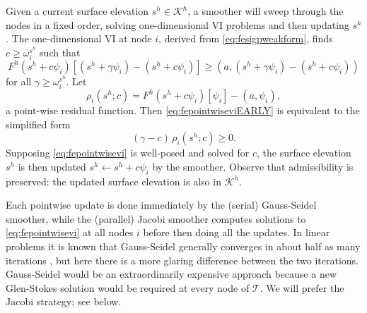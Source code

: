 \documentclass[letterpaper,final,12pt,reqno]{amsart}
\theoremstyle{claim}
\newcommand{\ip}[2]{\left(#1,#2\right)}
\numberwithin{equation}{section}
\numberwithin{figure}{section}
\numberwithin{table}{section}
\numberwithin{theorem}{section}
\begin{document}
Given a current surface elevation $s^h\in \mathcal{K}^h$, a smoother will sweep through the nodes in a fixed order, solving one-dimensional VI problems and then updating $s^h$.  The one-dimensional VI at node $i$, derived from \eqref{eq:fesigpweakform}, finds $c \ge \omega_i^{s^h}$ such that
\begin{equation}
F^h(s^h+c\psi_i)[(s^h+\gamma \psi_i) - (s^h+c \psi_i)] \ge \ip{a}{(s^h+\gamma \psi_i) - (s^h+c \psi_i)} \label{eq:fepointwiseviEARLY}
\end{equation}
for all $\gamma \ge \omega_i^{s^h}$.  Let
\begin{equation}
\rho_i(s^h; c) = F^h(s^h+c\psi_i)[\psi_i] - \ip{a}{\psi_i}, \label{eq:ferhoi}
\end{equation}
a point-wise residual function.  Then \eqref{eq:fepointwiseviEARLY} is equivalent to the simplified form
\begin{equation}
(\gamma - c) \,\rho_i(s^h; c) \ge 0. \label{eq:fepointwisevi}
\end{equation}
Supposing \eqref{eq:fepointwisevi} is well-posed and solved for $c$, the surface elevation $s^h$ is then updated $s^h \gets s^h + c \psi_i$ by the smoother.  Observe that admissibility is preserved: the updated surface elevation is also in $\mathcal{K}^h$.

Each pointwise update is done immediately by the (serial) Gauss-Seidel smoother, while the (parallel) Jacobi smoother computes solutions to \eqref{eq:fepointwisevi} at all nodes $i$ before then doing all the updates.  In linear problems it is known that Gauss-Seidel generally converges in about half as many iterations \cite{Greenbaum1997}, but here there is a more glaring difference between the two iterations.  Gauss-Seidel would be an extraordinarily expensive approach because a new Glen-Stokes solution would be required at every node of $\mathcal{T}$.  We will prefer the Jacobi strategy; see below.
\end{document}
